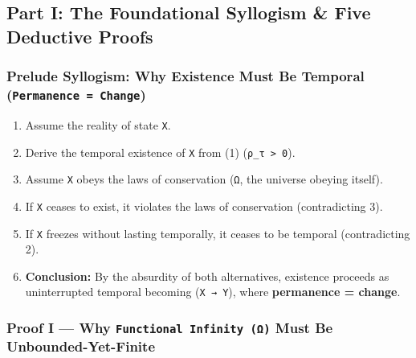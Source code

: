 \documentclass[
]{article}
\begin{document}
\subsection{Part I: The Foundational Syllogism \& Five Deductive
Proofs}\label{part-i-the-foundational-syllogism-five-deductive-proofs}

\subsubsection{\texorpdfstring{Prelude Syllogism: Why Existence Must Be
Temporal
(\texttt{Permanence~=~Change})}{Prelude Syllogism: Why Existence Must Be Temporal (Permanence~=~Change)}}\label{prelude-syllogism-why-existence-must-be-temporal-permanence-change}

\begin{enumerate}
\def\labelenumi{\arabic{enumi}.}
\item
  Assume the reality of state \texttt{X}.
\item
  Derive the temporal existence of \texttt{X} from (1)
  (\texttt{ρ\_τ~\textgreater{}~0}).
\item
  Assume \texttt{X} obeys the laws of conservation (\texttt{Ω}, the
  universe obeying itself).
\item
  If \texttt{X} ceases to exist, it violates the laws of conservation
  (contradicting 3).
\item
  If \texttt{X} freezes without lasting temporally, it ceases to be
  temporal (contradicting 2).
\item
  \textbf{Conclusion:} By the absurdity of both alternatives, existence
  proceeds as uninterrupted temporal becoming (\texttt{X~→~Y}), where
  \textbf{permanence = change}.
\end{enumerate}

\subsubsection{\texorpdfstring{Proof I --- Why
\texttt{Functional~Infinity~(Ω)} Must Be
Unbounded-Yet-Finite}{Proof I --- Why Functional~Infinity~(Ω) Must Be Unbounded-Yet-Finite}}\label{proof-i-why-functional-infinity-ux3c9-must-be-unbounded-yet-finite}
\end{document}
